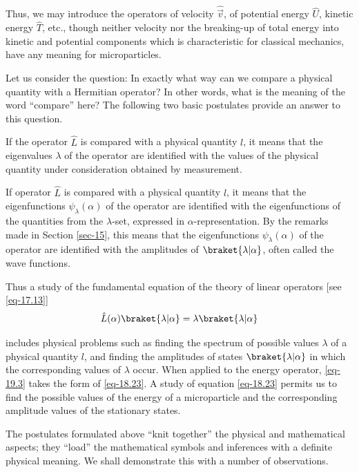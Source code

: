 \documentclass[a4paper,sfsidenotes,colorlinks=true]{tufte-book}
\numberwithin{equation}{section}
\numberwithin{figure}{section}
\begin{document}
Thus, we may introduce the operators of velocity $\hat{\vec{v}}$, of
potential energy $\hat{U}$, kinetic energy $\hat{T}$, etc., though
neither velocity nor the breaking-up of total energy into kinetic and
potential components which is characteristic for classical mechanics,
have any meaning for microparticles.

Let us consider the question: In exactly
what way can we compare a physical quantity with a Hermitian operator?
In other words, what is the meaning of the word ``compare'' here? The
following two basic postulates provide an answer to this question.

\begin{description}[leftmargin=1cm]
\item[Postulate 1.] If the operator $\hat{L}$ is compared with a physical
quantity $l$, it means that the eigenvalues $\lambda$ of the operator are
identified with the values of the physical quantity under
consideration obtained by measurement.
\item[Postulate 2.] If operator $\hat{L}$ is compared with a physical
  quantity $l$, it means that the eigenfunctions
  $\psi_{\lambda}(\alpha)$ of the operator are identified with the
  eigenfunctions of the quantities from the $\lambda$-set, expressed
  in $\alpha$-representation. By the remarks made in Section
  \ref{sec-15}, this means that the eigenfunctions  $\psi_{\lambda}(\alpha)$ of the
  operator are identified with the amplitudes of $\braket{\lambda | \alpha}$, often
  called the wave functions.
\end{description}

Thus a study of the fundamental equation of the theory of linear
operators [see \ref{eq-17.13}]
\begin{equation}%
\hat{L}(\alpha) \braket{\lambda|\alpha} = \lambda \braket{\lambda|\alpha}
\label{eq-19.3}
\end{equation}

includes physical problems such as finding the spectrum of possible
values $\lambda$ of a physical quantity $l$, and finding the
amplitudes of states $\braket{\lambda|\alpha}$ in which the
corresponding values of $\lambda$ occur. When applied to the energy
operator, \ref{eq-19.3} takes the form of \ref{eq-18.23}. A study of equation
\ref{eq-18.23} permits us to find the possible values of the energy of a
microparticle and the corresponding amplitude values of the stationary
states.


The postulates formulated above ``knit together'' the physical
and mathematical aspects; they ``load'' the mathematical symbols and
inferences with a definite physical meaning. We shall demonstrate this
with a number of observations. 
\end{document}
